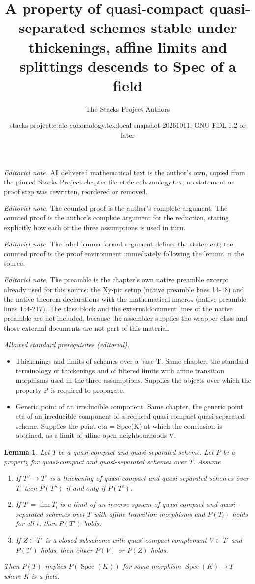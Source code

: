 \documentclass[10pt,a4paper]{amsart}
\title{A property of quasi-compact quasi-separated schemes stable under thickenings, affine limits and splittings descends to Spec of a field}
\author{The Stacks Project Authors}
\date{stacks-project:etale-cohomology.tex:local-snapshot-20261011; GNU FDL 1.2 or later}
\theoremstyle{plain}
\newtheorem{lemma}[subsection]{Lemma}
\theoremstyle{definition}
\theoremstyle{remark}
\numberwithin{equation}{subsection}
\def\lim{\mathop{\mathrm{lim}}\nolimits}
\def\Spec{\mathop{\mathrm{Spec}}}
\begin{document}
\maketitle
\noindent\textit{Editorial note.} All delivered mathematical text is the author's own, copied from the pinned Stacks Project chapter file etale-cohomology.tex; no statement or proof step was rewritten, reordered or removed.\par\medskip
\noindent\textit{Editorial note.} The counted proof is the author's complete argument: The counted proof is the author's complete argument for the reduction, stating explicitly how each of the three assumptions is used in turn.\par\medskip
\noindent\textit{Editorial note.} The label lemma-formal-argument defines the statement; the counted proof is the proof environment immediately following the lemma in the source.\par\medskip
\noindent\textit{Editorial note.} The preamble is the chapter's own native preamble excerpt already used for this source: the Xy-pic setup (native preamble lines 14-18) and the native theorem declarations with the mathematical macros (native preamble lines 154-217). The class block and the externaldocument lines of the native preamble are not included, because the assembler supplies the wrapper class and those external documents are not part of this material.\par\medskip
\noindent\textit{Allowed standard prerequisites (editorial).}\begin{itemize}
\item Thickenings and limits of schemes over a base T. Same chapter, the standard terminology of thickenings and of filtered limits with affine transition morphisms used in the three assumptions. Supplies the objects over which the property P is required to propagate.
\item Generic point of an irreducible component. Same chapter, the generic point eta of an irreducible component of a reduced quasi-compact quasi-separated scheme. Supplies the point eta = Spec(K) at which the conclusion is obtained, as a limit of affine open neighbourhoods V.
\end{itemize}\medskip
\begin{lemma}
\label{lemma-formal-argument}
Let $T$ be a quasi-compact and quasi-separated scheme.
Let $P$ be a property for quasi-compact and quasi-separated
schemes over $T$. Assume
\begin{enumerate}
\item If $T'' \to T'$ is a thickening of quasi-compact and
quasi-separated schemes over $T$, then $P(T'')$ if and only if $P(T')$.
\item If $T' = \lim T_i$ is a limit of an inverse system of
quasi-compact and quasi-separated schemes over $T$ with affine
transition morphisms and $P(T_i)$ holds for all $i$, then
$P(T')$ holds.
\item If $Z \subset T'$ is a closed subscheme with
quasi-compact complement $V \subset T'$ and $P(T')$ holds,
then either $P(V)$ or $P(Z)$ holds.
\end{enumerate}
Then $P(T)$ implies $P(\Spec(K))$ for some morphism $\Spec(K) \to T$
where $K$ is a field.
\end{lemma}
\end{document}
